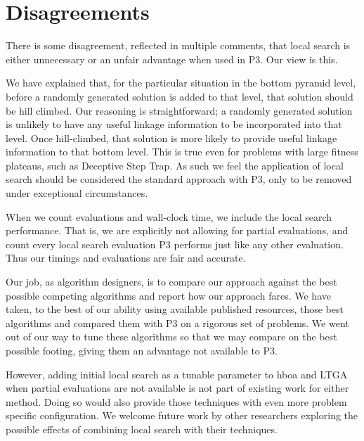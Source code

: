 \documentclass[]{article}
\begin{document}
\section{Disagreements}

There is some disagreement, reflected in multiple comments, that local search is either unnecessary or an unfair advantage when used in P3. Our view is this.

We have explained that, for the particular situation in the bottom pyramid level,
before a randomly generated solution is added to that level, that solution should be hill climbed.
Our reasoning is straightforward; a randomly generated solution is unlikely to
have any useful linkage information to be incorporated into that level.
Once hill-climbed, that solution is more likely to provide useful linkage information to that bottom level.
This is true even for problems with large fitness plateaus, such as Deceptive Step Trap.
As such we feel the application of local search should be considered the standard approach
with P3, only to be removed under exceptional circumstances.

When we count evaluations and wall-clock time, we include the local search performance. That is, we are explicitly not allowing for partial evaluations, and count every local search evaluation P3 performs just like any other evaluation. Thus our timings and evaluations are fair and accurate.

Our job, as algorithm designers, is to compare our approach against the best possible competing algorithms
and report how our approach fares. We have taken, to the best of our ability using available published resources,
those best algorithms and compared them with P3 on a rigorous set of problems.
We went out of our way to tune these algorithms
so that we may compare on the best possible footing, giving them an advantage not available to P3.

However, adding initial local search as a tunable parameter to hboa and LTGA when partial evaluations are not available is not part
of existing work for either method. Doing so would also provide those techniques
with even more problem specific configuration. We welcome future work by other researchers exploring the possible effects of combining
local search with their techniques.
\end{document}
